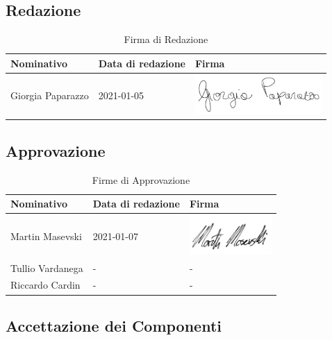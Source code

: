\documentclass[../piano_di_progetto.tex]{subfiles}
\begin{document}
\subsection{Redazione}%
\label{sub:red}

\begin{table}[!ht]
	\centering
	\begin{tabular}{|l|l|l|}
		\hline
		\rowcolor{lightgray}
		\textbf{Nominativo} & \textbf{Data di redazione} & \textbf{Firma} \\ 
		\hline
			Giorgia Paparazzo & 2021-01-05 & \includegraphics[height=1.5cm]{componenti/img/firma_gp.png} \\
		\hline
	\end{tabular}
	\caption{Firma di Redazione}
\end{table}


\subsection{Approvazione}%
\label{sub:app}

\begin{table}[!ht]
	\centering
	\begin{tabular}{|l|l|l|}
		\hline
		\rowcolor{lightgray}
		\textbf{Nominativo} & \textbf{Data di redazione} & \textbf{Firma} \\ 

		\hline
			Martin Masevski & 2021-01-07 & \includegraphics[height=1.5cm]{componenti/img/firma_mm.png} \\ 
		\hline
			Tullio Vardanega & - & - \\
		\hline
			Riccardo Cardin  & - & - \\
		\hline
	\end{tabular}
		\caption{Firme di Approvazione}
\end{table}


\newpage
\subsection{Accettazione dei Componenti}%
\label{sub:acc_comp}
\end{document}
